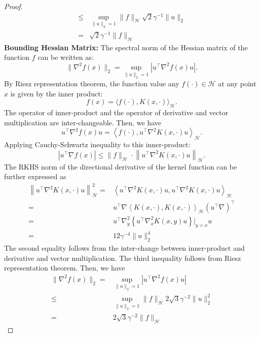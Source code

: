 \documentclass[12pt]{article}
\begin{document}
\begin{proof}
\begin{align*}
    \leq  & \sup_{\|u\|_2=1}\|f\|_{\mathcal{H}}\sqrt{2}\gamma^{-1}\|u\|_2\\
    = &\sqrt{2}\gamma^{-1} \|f\|_{\mathcal{H}}
\end{align*}
\textbf{Bounding Hessian Matrix:} The spectral norm of the Hessian matrix of the function $f$ can be written as: 
    $$\|\nabla^2 f(x)\|_2 = \sup_{\|u\|_2=1} |u^\top \nabla^2 f(x) u|.$$
By Riesz representation theorem, the function value any $f(\cdot)\in \mathcal{H}$ at any point $x$ is given by the inner product:$$f(x) = \langle f(\cdot), K(x, \cdot) \rangle_{\mathcal{H}}.$$
The operator of inner-product and the operator of derivative and vector multiplication are inter-changeable. Then, we have
$$u^\top \nabla^2 f(x) u = \left\langle f(\cdot), u^\top \nabla^2 K(x, \cdot) u \right\rangle_{\mathcal{H}}.$$
Applying Cauchy-Schwartz inequality to this inner-product:
$$\left|u^\top \nabla f(x)\right| \leq \|f\|_{\mathcal{H}} \cdot \left\| u^\top \nabla^2 K(x, \cdot) u\right\|_{\mathcal{H}}.$$
The RKHS norm of the directional derivative of the kernel function can be further expressed as
\begin{align*}
    \left\| u^\top \nabla^2 K(x, \cdot)u\right\|^2_{\mathcal{H}}=& \left\langle u^\top \nabla^2 K(x, \cdot)u, u^\top \nabla^2 K(x, \cdot)u \right\rangle_{\mathcal{H}}\\
    =& u^\top \nabla\left\langle  K(x, \cdot),  K(x, \cdot) \right\rangle_{\mathcal{H}}(u^\top \nabla)^\top\\
    = & u^\top\nabla_y^2\left\{u^\top\nabla_x^2 K(x,y) u\right\}|_{y=x} u\\
    = & 12\gamma^{-4}\|u\|_2^4
\end{align*}
The second equality follows from the inter-change between inner-product and derivative and vector multiplication. The third inequality follows from Riesz representation theorem. Then, we have
\begin{align*}
    \|\nabla^2 f(x)\|_2 = &\sup_{\|u\|_2=1} |u^\top \nabla^2 f(x) u|\\
    \leq  & \sup_{\|u\|_2=1}\|f\|_{\mathcal{H}}2\sqrt{3}\gamma^{-2}\|u\|_2^2\\
    = &2\sqrt{3}\gamma^{-2} \|f\|_{\mathcal{H}}
\end{align*}


\end{proof}


\end{document}
